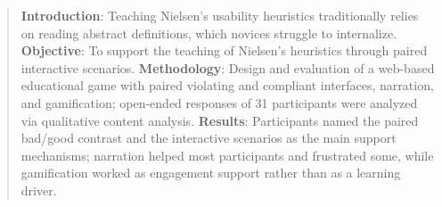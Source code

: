\begin{abstract}
\textbf{Introduction}: Teaching Nielsen's usability heuristics traditionally relies on reading abstract definitions, which novices struggle to internalize.
\textbf{Objective}: To support the teaching of Nielsen's heuristics through paired interactive scenarios.
\textbf{Methodology}: Design and evaluation of a web-based educational game with paired violating and compliant interfaces, narration, and gamification; open-ended responses of 31 participants were analyzed via qualitative content analysis.
\textbf{Results}: Participants named the paired bad/good contrast and the interactive scenarios as the main support mechanisms; narration helped most participants and frustrated some, while gamification worked as engagement support rather than as a learning driver.
\end{abstract}
 
 